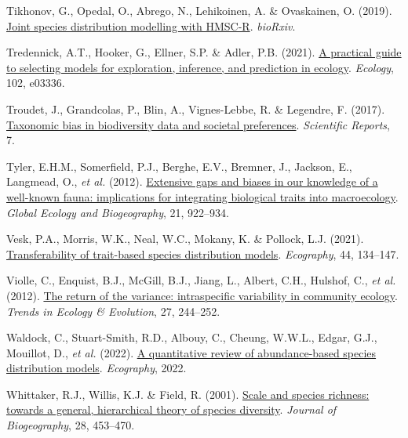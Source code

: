 \documentclass[9pt,biorxiv,doublespacing,lineno,endfloat]{lapreprint}
\newlength{\cslhangindent}
\newlength{\cslentryspacingunit} %
\newenvironment{CSLReferences}[2] %
 {%
  \setlength{\parindent}{0pt}
  \ifodd #1
  \let\oldpar\par
  \def\par{\hangindent=\cslhangindent\oldpar}
  \fi
  \setlength{\parskip}{#2\cslentryspacingunit}
 }%
 {}
\begin{document}
\begin{CSLReferences}{1}{0}
\leavevmode{}%
Tikhonov, G., Opedal, O., Abrego, N., Lehikoinen, A. \& Ovaskainen, O.
(2019). \href{https://doi.org/10.1101/603217}{Joint species distribution
modelling with HMSC-R}. \emph{bioRxiv}.

\leavevmode{}%
Tredennick, A.T., Hooker, G., Ellner, S.P. \& Adler, P.B. (2021).
\href{https://doi.org/10.1002/ecy.3336}{A practical guide to selecting
models for exploration, inference, and prediction in ecology}.
\emph{Ecology}, 102, e03336.

\leavevmode{}%
Troudet, J., Grandcolas, P., Blin, A., Vignes-Lebbe, R. \& Legendre, F.
(2017). \href{https://doi.org/10.1038/s41598-017-09084-6}{Taxonomic bias
in biodiversity data and societal preferences}. \emph{Scientific
Reports}, 7.

\leavevmode{}%
Tyler, E.H.M., Somerfield, P.J., Berghe, E.V., Bremner, J., Jackson, E.,
Langmead, O., \emph{et al.} (2012).
\href{https://doi.org/10.1111/j.1466-8238.2011.00726.x}{Extensive gaps
and biases in our knowledge of a well-known fauna: implications for
integrating biological traits into macroecology}. \emph{Global Ecology
and Biogeography}, 21, 922--934.

\leavevmode{}%
Vesk, P.A., Morris, W.K., Neal, W.C., Mokany, K. \& Pollock, L.J.
(2021). \href{https://doi.org/10.1111/ecog.05179}{Transferability of
trait-based species distribution models}. \emph{Ecography}, 44,
134--147.

\leavevmode{}%
Violle, C., Enquist, B.J., McGill, B.J., Jiang, L., Albert, C.H.,
Hulshof, C., \emph{et al.} (2012).
\href{https://doi.org/10.1016/j.tree.2011.11.014}{The return of the
variance: intraspecific variability in community ecology}. \emph{Trends
in Ecology \& Evolution}, 27, 244--252.

\leavevmode{}%
Waldock, C., Stuart-Smith, R.D., Albouy, C., Cheung, W.W.L., Edgar,
G.J., Mouillot, D., \emph{et al.} (2022).
\href{https://doi.org/10.1111/ecog.05694}{A quantitative review of
abundance-based species distribution models}. \emph{Ecography}, 2022.

\leavevmode{}%
Whittaker, R.J., Willis, K.J. \& Field, R. (2001).
\href{https://doi.org/10.1046/j.1365-2699.2001.00563.x}{Scale and
species richness: towards a general, hierarchical theory of species
diversity}. \emph{Journal of Biogeography}, 28, 453--470.


\end{CSLReferences}
\end{document}
